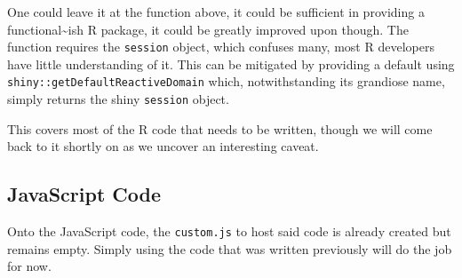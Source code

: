 \documentclass[
]{krantz}
\makeatletter
\newenvironment{Shaded}{\begin{snugshade}}{\end{snugshade}}
\newcommand{\CommentTok}[1]{\textcolor[rgb]{0.37,0.37,0.37}{\textit{#1}}}
\newcommand{\ControlFlowTok}[1]{\textcolor[rgb]{0.27,0.27,0.27}{\textbf{#1}}}
\newcommand{\DataTypeTok}[1]{\textcolor[rgb]{0.27,0.27,0.27}{#1}}
\newcommand{\KeywordTok}[1]{\textcolor[rgb]{0.27,0.27,0.27}{\textbf{#1}}}
\newcommand{\NormalTok}[1]{#1}
\newcommand{\OperatorTok}[1]{\textcolor[rgb]{0.43,0.43,0.43}{\textbf{#1}}}
\newcommand{\StringTok}[1]{\textcolor[rgb]{0.5,0.5,0.5}{#1}}
\newenvironment{kframe}{%
\medskip{}
\setlength{\fboxsep}{.8em}
 \def\at@end@of@kframe{}%
 \ifinner\ifhmode%
  \def\at@end@of@kframe{\end{minipage}}%
  \begin{minipage}{\columnwidth}%
 \fi\fi%
 \def\FrameCommand##1{\hskip\@totalleftmargin \hskip-\fboxsep
 \colorbox{shadecolor}{##1}\hskip-\fboxsep
     \hskip-\linewidth \hskip-\@totalleftmargin \hskip\columnwidth}%
 \MakeFramed {\advance\hsize-\width
   \@totalleftmargin\z@ \linewidth\hsize
   \@setminipage}}%
 {\par\unskip\endMakeFramed%
 \at@end@of@kframe}
\renewenvironment{Shaded}{\begin{kframe}}{\end{kframe}}
\makeatother
\begin{document}
One could leave it at the function above, it could be sufficient in providing a functional\textasciitilde ish R package, it could be greatly improved upon though. The function requires the \texttt{session} object, which confuses many, most R developers have little understanding of it. This can be mitigated by providing a default using \texttt{shiny::getDefaultReactiveDomain} which, notwithstanding its grandiose name, simply returns the shiny \texttt{session} object.

\begin{Shaded}
\end{Shaded}

This covers most of the R code that needs to be written, though we will come back to it shortly on as we uncover an interesting caveat.

\hypertarget{shiny-complete-pkg-js-code}{%
\subsection{JavaScript Code}\label{shiny-complete-pkg-js-code}}

Onto the JavaScript code, the \texttt{custom.js} to host said code is already created but remains empty. Simply using the code that was written previously will do the job for now.
\end{document}
